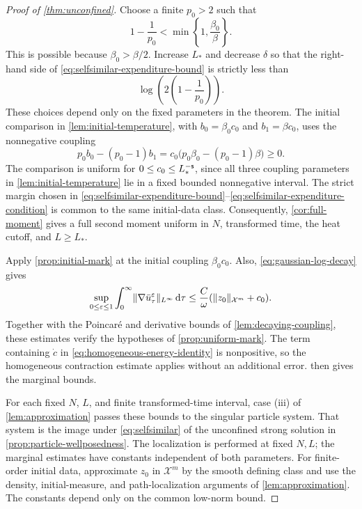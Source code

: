 \documentclass[11pt,reqno]{amsart}
\numberwithin{equation}{section}
\theoremstyle{plain}
\theoremstyle{remark}
\DeclarePairedDelimiter{\norm}{\lVert}{\rVert}
\newcommand{\Xspace}{\mathcal X}
\begin{document}
\begin{proof}[Proof of \cref{thm:unconfined}]
Choose a finite $p_0>2$ such that
\begin{equation}\label{eq:selfsimilar-initial-exponent}
 1-\frac1{p_0}<\min\left\{1,\frac{\beta_0}{\beta}\right\}.
\end{equation}
This is possible because $\beta_0>\beta/2$. Increase $L_*$ and decrease $\delta$ so that the right-hand side of \eqref{eq:selfsimilar-expenditure-bound} is strictly less than
\begin{equation}\label{eq:selfsimilar-expenditure-condition}
 \log\left(2\left(1-\frac1{p_0}\right)\right).
\end{equation}
These choices depend only on the fixed parameters in the theorem. The initial comparison in \cref{lem:initial-temperature}, with $b_0=\beta_0c_0$ and $b_1=\beta c_0$, uses the nonnegative coupling
\begin{equation}\label{eq:selfsimilar-comparison-coupling}
 p_0b_0-(p_0-1)b_1=c_0\bigl(p_0\beta_0-(p_0-1)\beta\bigr)\ge0.
\end{equation}
The comparison is uniform for $0\le c_0\le L_*^{-\mathsf{s}}$, since all three coupling parameters in \cref{lem:initial-temperature} lie in a fixed bounded nonnegative interval. The strict margin chosen in \eqref{eq:selfsimilar-expenditure-bound}--\eqref{eq:selfsimilar-expenditure-condition} is common to the same initial-data class. Consequently, \cref{cor:full-moment} gives a full second moment uniform in $N$, transformed time, the heat cutoff, and $L\ge L_*$.

Apply \cref{prop:initial-mark} at the initial coupling $\beta_0c_0$. Also, \eqref{eq:gaussian-log-decay} gives
\begin{equation}\label{eq:selfsimilar-velocity-integral}
 \sup_{0\le\varepsilon\le1}\int_0^\infty
      \norm{\nabla\bar u_\tau^\varepsilon}_{L^\infty}\dd\tau
 \le\frac C\omega(\norm{z_0}_{\Xspace^m}+c_0).
\end{equation}
Together with the Poincar\'e and derivative bounds of \cref{lem:decaying-coupling}, these estimates verify the hypotheses of \cref{prop:uniform-mark}. The term containing $\dot c$ in \eqref{eq:homogeneous-energy-identity} is nonpositive, so the homogeneous contraction estimate applies without an additional error.  then gives the marginal bounds.

For each fixed $N$, $L$, and finite transformed-time interval, case \textup{(iii)} of \cref{lem:approximation} passes these bounds to the singular particle system. That system is the image under \eqref{eq:selfsimilar} of the unconfined strong solution in \cref{prop:particle-wellposedness}. The localization is performed at fixed $N,L$; the marginal estimates have constants independent of both parameters. For finite-order initial data, approximate $z_0$ in $\Xspace^m$ by the smooth defining class and use the density, initial-measure, and path-localization arguments of \cref{lem:approximation}. The constants depend only on the common low-norm bound.


\end{proof}
\end{document}
